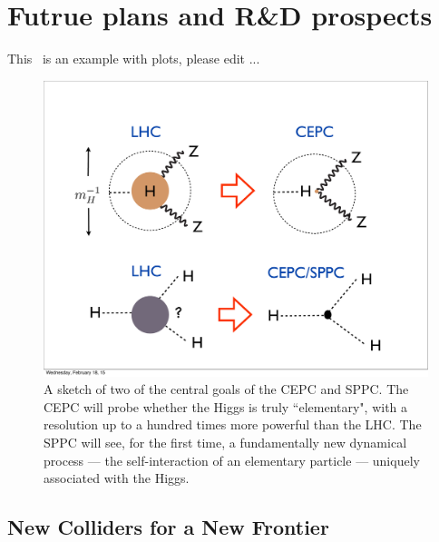 \chapter{Futrue plans and R\&D prospects}
\label{Chapter:FuturePlan}


This~\cite{cepc_website} is an example with plots, please edit ... 
%
\begin{figure}[h!]
\centering
\includegraphics[scale=0.36]{Figures/FuturePlan/main_theme}
\caption{A sketch of two of the central goals of the CEPC and SPPC. The CEPC will probe whether the Higgs is truly ``elementary", with a resolution up to a hundred times more powerful than the LHC. The SPPC will see, for the first time, a fundamentally new dynamical process --- the self-interaction of an elementary particle --- uniquely associated with the Higgs.}
\label{fig:main_theme}
\end{figure}
%
\section{New Colliders for a New Frontier}


